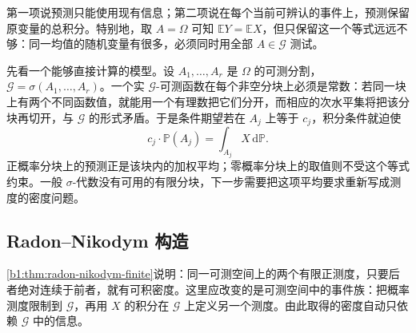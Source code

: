 第一项说预测只能使用现有信息；第二项说在每个当前可辨认的事件上，预测保留原变量的总积分。特别地，取 \(A=\Omega\) 可知 \(\mathbb E Y=\mathbb E X\)，但只保留这一个等式远远不够：同一均值的随机变量有很多，必须同时用全部 \(A\in\mathcal G\) 测试。

\ProseParagraphBreak

先看一个能够直接计算的模型。设 \(A_1,\ldots,A_r\) 是 \(\Omega\) 的可测分割，\(\mathcal G=\sigma(A_1,\ldots,A_r)\)。一个实 \(\mathcal G\)-可测函数在每个非空分块上必须是常数：若同一块上有两个不同函数值，就能用一个有理数把它们分开，而相应的次水平集将把该分块再切开，与 \(\mathcal G\) 的形式矛盾。于是条件期望若在 \(A_j\) 上等于 \(c_j\)，积分条件就迫使
\[
 c_j\cdot\mathbb P(A_j)=\int_{A_j}X\,\mathrm d\mathbb P.
\]
正概率分块上的预测正是该块内的加权平均；零概率分块上的取值则不受这个等式约束。一般 \(\sigma\)-代数没有可用的有限分块，下一步需要把这项平均要求重新写成测度的密度问题。

\subsection{Radon–Nikodym 构造}
\label{b1:subsec:310102}

\cref{b1:thm:radon-nikodym-finite}说明：同一可测空间上的两个有限正测度，只要后者绝对连续于前者，就有可积密度。这里应改变的是可测空间中的事件族：把概率测度限制到 \(\mathcal G\)，再用 \(X\) 的积分在 \(\mathcal G\) 上定义另一个测度。由此取得的密度自动只依赖 \(\mathcal G\) 中的信息。


